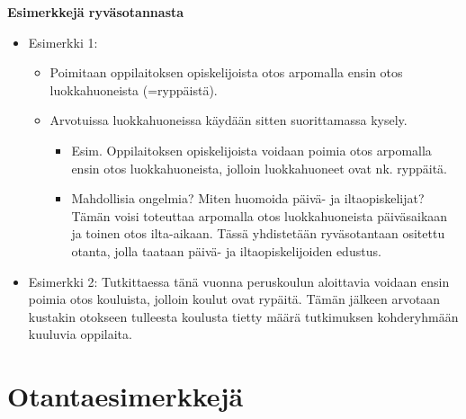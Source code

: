 \documentclass[
]{book}
\providecommand{\tightlist}{%
  \setlength{\itemsep}{0pt}\setlength{\parskip}{0pt}}
\begin{document}
\begin{eblock}{}

\textbf{Esimerkkejä ryväsotannasta}

\begin{itemize}
\tightlist
\item
  Esimerkki 1:

  \begin{itemize}
  \tightlist
  \item
    Poimitaan oppilaitoksen opiskelijoista otos arpomalla ensin otos luokkahuoneista (=ryppäistä).
  \item
    Arvotuissa luokkahuoneissa käydään sitten suorittamassa kysely.

    \begin{itemize}
    \tightlist
    \item
      Esim. Oppilaitoksen opiskelijoista voidaan poimia otos arpomalla ensin otos luokkahuoneista, jolloin luokkahuoneet ovat nk. ryppäitä.
    \item
      Mahdollisia ongelmia? Miten huomoida päivä- ja iltaopiskelijat? Tämän voisi toteuttaa arpomalla otos luokkahuoneista päiväsaikaan ja toinen otos ilta-aikaan. Tässä yhdistetään ryväsotantaan ositettu otanta, jolla taataan päivä- ja iltaopiskelijoiden edustus.
    \end{itemize}
  \end{itemize}
\item
  Esimerkki 2: Tutkittaessa tänä vuonna peruskoulun aloittavia voidaan ensin poimia otos kouluista, jolloin koulut ovat rypäitä. Tämän jälkeen arvotaan kustakin otokseen tulleesta koulusta tietty määrä tutkimuksen kohderyhmään kuuluvia oppilaita.
\end{itemize}

\end{eblock}

\hypertarget{alaluku56}{%
\section{Otantaesimerkkejä}\label{alaluku56}}
\end{document}
